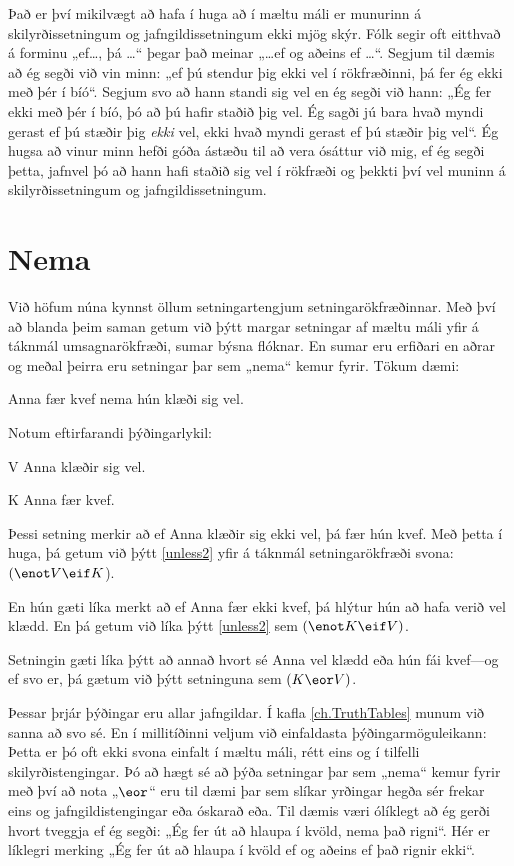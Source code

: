 Það er því mikilvægt að hafa í huga að í mæltu máli er munurinn á skilyrðissetningum og jafngildissetningum ekki mjög skýr. Fólk segir oft eitthvað á forminu „ef\ldots, þá \ldots“ þegar það meinar „\ldots ef og aðeins ef \ldots“. Segjum til dæmis að ég segði við vin minn: „ef þú stendur þig ekki vel í rökfræðinni, þá fer ég ekki með þér í bíó“. Segjum svo að hann standi sig vel en ég segði við hann: „Ég fer ekki með þér í bíó, þó að þú hafir staðið þig vel. Ég sagði jú bara hvað myndi gerast ef þú stæðir þig \emph{ekki} vel, ekki hvað myndi gerast ef þú stæðir þig vel“. Ég hugsa að vinur minn hefði góða ástæðu til að vera ósáttur við mig, ef ég segði þetta, jafnvel þó að hann hafi staðið sig vel í rökfræði og þekkti því vel muninn á skilyrðissetningum og jafngildissetningum. 
	

\section{Nema}

Við höfum núna kynnst öllum setningartengjum setningarökfræðinnar. Með því að blanda þeim saman getum við þýtt margar setningar af mæltu máli yfir á táknmál umsagnarökfræði, sumar býsna flóknar. En sumar eru erfiðari en aðrar og meðal þeirra eru setningar þar sem „nema“ kemur fyrir. Tökum dæmi:

\begin{earg}
\item[\ex{unless2}] Anna fær kvef nema hún klæði sig vel. 
\end{earg}
Notum eftirfarandi þýðingarlykil:
	\begin{ekey}
		\item[V] Anna klæðir sig vel.
		\item[K] Anna fær kvef.
	\end{ekey}
Þessi setning merkir að ef Anna klæðir sig ekki vel, þá fær hún kvef. Með þetta í huga, þá getum við þýtt \ref{unless2} yfir á táknmál setningarökfræði svona: $(\enot V \eif K$).	

En hún gæti líka merkt að ef Anna fær ekki kvef, þá hlýtur hún að hafa verið vel klædd. En þá getum við líka þýtt \ref{unless2} sem $(\enot K \eif V)$.

Setningin gæti líka þýtt að annað hvort sé Anna vel klædd eða hún fái kvef---og ef svo er, þá gætum við þýtt setninguna sem $(K \eor V)$. 

Þessar þrjár þýðingar eru allar jafngildar. Í kafla \ref{ch.TruthTables} munum við sanna að svo sé. En í millitíðinni veljum við einfaldasta þýðingarmöguleikann:
Þetta er þó oft ekki svona einfalt í mæltu máli, rétt eins og í tilfelli skilyrðistengingar. Þó að hægt sé að þýða setningar þar sem „nema“ kemur fyrir með því að nota „$\eor$“ eru til dæmi þar sem slíkar yrðingar hegða sér frekar eins og jafngildistengingar eða óskarað eða. Til dæmis væri ólíklegt að ég gerði hvort tveggja ef ég segði: „Ég fer út að hlaupa í kvöld, nema það rigni“. Hér er líklegri merking „Ég fer út að hlaupa í kvöld ef og aðeins ef það rignir ekki“. 	
	
